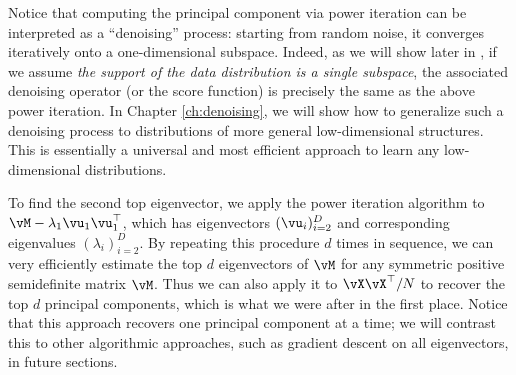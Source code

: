 \documentclass[../../book-main.tex]{subfiles}
\begin{document}
\begin{remark} Notice that
    computing the principal component via power iteration can be
    interpreted as a ``denoising'' process: starting from random
    noise, it converges iteratively onto a one-dimensional subspace.
    Indeed, as we will show later in , if we
    assume {\em the support of the data distribution is a single
    subspace}, the associated denoising operator (or the score
    function) is precisely the same as the above power iteration. In
    Chapter \ref{ch:denoising}, we will show how to generalize such a
    denoising process to distributions of more general
    low-dimensional structures. This is essentially a universal and
    most efficient approach to learn any low-dimensional distributions.
\end{remark}

To find the second top eigenvector, we apply the power iteration
algorithm to \(\vM - \lambda_{1}\vu_{1}\vu_{1}^{\top}\), which has
eigenvectors \((\vu_{i})_{i = 2}^{D}\) and corresponding eigenvalues
\((\lambda_{i})_{i = 2}^{D}\). By repeating this procedure \(d\)
times in sequence, we can very efficiently estimate the top \(d\)
eigenvectors of \(\vM\) for any symmetric positive semidefinite
matrix \(\vM\). Thus we can also apply it to \(\vX\vX^{\top}/N\) to
recover the top \(d\) principal components, which is what we were
after in the first place. Notice that this approach recovers one
principal component at a time; we will contrast this to other
algorithmic approaches, such as gradient descent on all eigenvectors,
in future sections.

%
\end{document}
